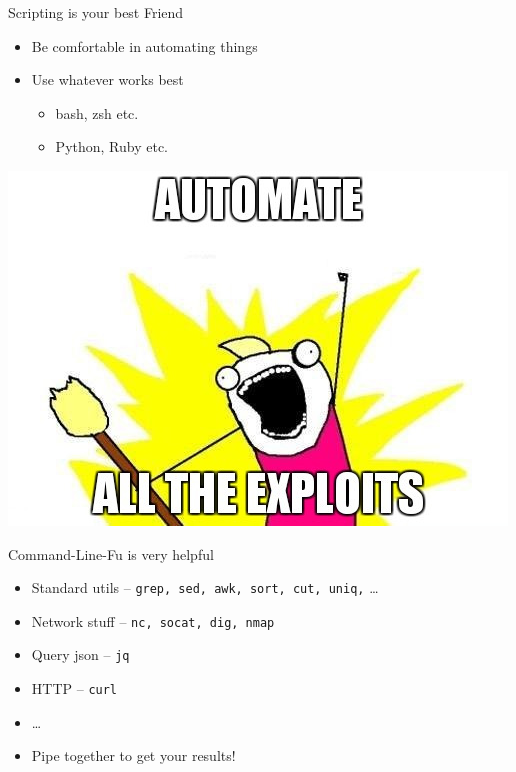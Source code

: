 \begin{frame}
  {Scripting is your best Friend}

  \begin{itemize}
    \item Be comfortable in automating things
    \item Use whatever works best
      \begin{itemize}
        \item bash, zsh etc.
        \item Python, Ruby etc.
      \end{itemize}
  \end{itemize}

  \begin{center}
    \includegraphics[height=0.5\textheight]{./images/automatealltheexploits.jpg}
  \end{center}
\end{frame}


\begin{frame}
  {Command-Line-Fu is very helpful}

  \begin{itemize}
    \item Standard utils -- \texttt{grep, sed, awk, sort, cut, uniq,} \ldots
    \item Network stuff -- \texttt{nc, socat, dig, nmap}
    \item Query json -- \texttt{jq}
    \item HTTP -- \texttt{curl}
    \item \ldots
  \end{itemize}

  \begin{itemize}
    \item Pipe together to get your results!
  \end{itemize}
\end{frame}


